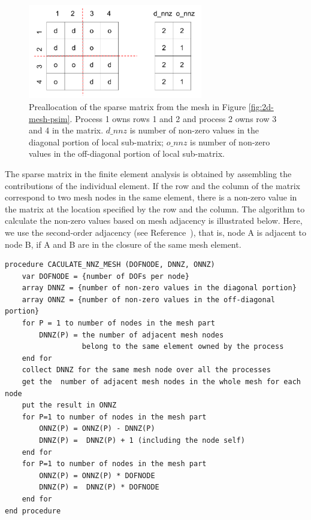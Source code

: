 \documentclass[11pt]{article}  %
\begin{document}
\begin{figure}
\center
\includegraphics[width=3in]{fig/sparseMatrix.png}
\caption{\small{Preallocation of the sparse matrix from the mesh in Figure \ref{fig:2d-mesh-psim}.  Process 1 owns rows 1 and 2 and process 2 owns row 3 and 4 in the matrix. $d\_nnz$ is number of non-zero values in the diagonal portion of local sub-matrix; $o\_nnz$ is number of non-zero values in the off-diagonal portion of local sub-matrix.}} 
\label{fig:sparseMatrix}
\end{figure}

 The sparse matrix in the finite element analysis is obtained by assembling the contributions of the individual element. If the row and the column of the matrix correspond to two mesh nodes in the same element, there is a non-zero value in the matrix at the location specified by the row and the column.  The algorithm to calculate the non-zero values based on mesh adjacency is illustrated below. Here, we use the second-order adjacency (see Reference~\cite{Seol2014}), that is,  node A is  adjacent to node B, if A and B  are in the closure of the same mesh element.  

\begin{samepage}
\begin{verbatim}
procedure CACULATE_NNZ_MESH (DOFNODE, DNNZ, ONNZ)
    var DOFNODE = {number of DOFs per node}
    array DNNZ = {number of non-zero values in the diagonal portion}
    array ONNZ = {number of non-zero values in the off-diagonal portion}
    for P = 1 to number of nodes in the mesh part
        DNNZ(P) = the number of adjacent mesh nodes
                  belong to the same element owned by the process 
    end for
    collect DNNZ for the same mesh node over all the processes
    get the  number of adjacent mesh nodes in the whole mesh for each node
    put the result in ONNZ
    for P=1 to number of nodes in the mesh part
        ONNZ(P) = ONNZ(P) - DNNZ(P)
        DNNZ(P) =  DNNZ(P) + 1 (including the node self)
    end for
    for P=1 to number of nodes in the mesh part
        ONNZ(P) = ONNZ(P) * DOFNODE
        DNNZ(P) =  DNNZ(P) * DOFNODE
    end for
end procedure
\end{verbatim}
\end{samepage}
\end{document}
